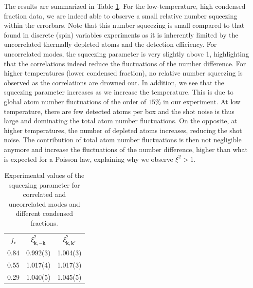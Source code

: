 The results are summarized in Table \ref{tab:squeezing}. For the low-temperature, high condensed fraction data, we are indeed able to observe a small relative number squeezing within the errorbars. Note that this number squeezing is small compared to that found in discrete (spin) variables experiments \cite{bucker2011,esteve2008squeezing, pezze2018} as it is inherently limited by the uncorrelated thermally depleted atoms and the detection efficiency. For uncorrelated modes, the squeezing parameter is very slightly above 1, highlighting that the correlations indeed reduce the fluctuations of the number difference. For higher temperatures (lower condensed fraction), no relative number squeezing is observed as the correlations are drowned out. In addition, we see that the squeezing parameter increases as we increase the temperature. This is due to global atom number fluctuations of the order of $15\%$ in our experiment. At low temperature, there are few detected atoms per box and the shot noise is thus large and dominating the total atom number fluctuations. On the opposite, at higher temperatures, the number of depleted atoms increases, reducing the shot noise. The contribution of total atom number fluctuations is then not negligible anymore and increase the fluctuations of the number difference, higher than what is expected for a Poisson law, explaining why we observe $\xi^2 > 1$.

\begin{table}[ht!]
    \centering
    {
    \begin{tabular}{ c|c|c }
        {\color{MainColor} $f_c$} & {\color{MainColor}$\xi^2_{\bm{k},-\bm{k}}$ } & {\color{MainColor}$\xi^2_{\bm{k},\bm{k}'}$} \\
        0.84 & 0.992(3) & 1.004(3) \\
        0.55 & 1.017(4) & 1.017(3) \\
        0.29 & 1.040(5) & 1.045(5) \\

    \end{tabular}}
    \caption{Experimental values of the squeezing parameter for correlated and uncorrelated modes and different condensed fractions.}
    \label{tab:squeezing}
\end{table}



